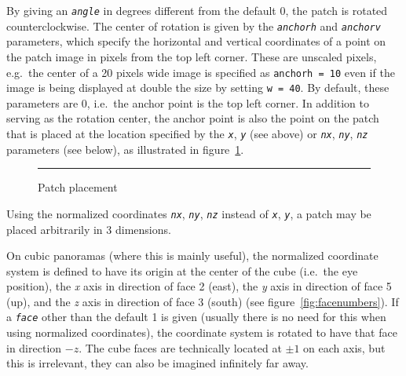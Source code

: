 \documentclass[
	a4paper,
	pagesize,
	10pt,
	oneside,
	idxtotoc,
	bibtotoc,
	BCOR10mm,
	DIV10
]{scrartcl} %
\newcommand{\luaparam}[1]{\texttt{\textit{#1}}}
\begin{document}
By giving an \luaparam{angle} in degrees different from the default 0, the patch is rotated counterclockwise. The center of rotation is given by the \luaparam{anchorh} and \luaparam{anchorv} parameters, which specify the horizontal and vertical coordinates of a point on the patch image in pixels from the top left corner. These are unscaled pixels, e.g.\ the center of a 20 pixels wide image is specified as \texttt{anchorh = 10} even if the image is being displayed at double the size by setting \texttt{w = 40}. By default, these parameters are 0, i.e.\ the anchor point is the top left corner. In addition to serving as the rotation center, the anchor point is also the point on the patch that is placed at the location specified by the \luaparam{x}, \luaparam{y} (see above) or \luaparam{nx}, \luaparam{ny}, \luaparam{nz} parameters (see below), as illustrated in figure~\ref{fig:patchplacement}.

\begin{figure}[tbb]
\centering
\setlength{\fboxsep}{3mm}
\rule{-10.01pt}{0pt}
\caption{Patch placement}\label{fig:patchplacement}
\end{figure}

Using the normalized coordinates \luaparam{nx}, \luaparam{ny}, \luaparam{nz} instead of \luaparam{x}, \luaparam{y}, a patch may be placed arbitrarily in 3 dimensions.

On cubic panoramas (where this is mainly useful), the normalized coordinate system is defined to have its origin at the center of the cube (i.e.\ the eye position), the \textit{x} axis in direction of face 2 (east), the \textit{y} axis in direction of face 5 (up), and the \textit{z} axis in direction of face 3 (south) (see figure~\ref{fig:facenumbers}). If a \luaparam{face} other than the default 1 is given (usually there is no need for this when using normalized coordinates), the coordinate system is rotated to have that face in direction $-z$. The cube faces are technically located at $\pm 1$ on each axis, but this is irrelevant, they can also be imagined infinitely far away.
\end{document}

